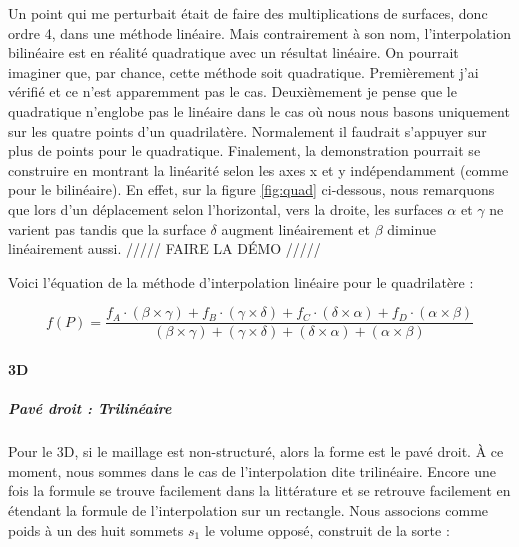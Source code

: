 Un point qui me perturbait était de faire des multiplications de surfaces, donc ordre 4, dans une méthode linéaire.
Mais contrairement à son nom, l'interpolation bilinéaire est en réalité quadratique avec un résultat linéaire.
On pourrait imaginer que, par chance, cette méthode soit quadratique.
Premièrement j'ai vérifié et ce n'est apparemment pas le cas.
Deuxièmement je pense que le quadratique n'englobe pas le linéaire dans le cas où nous nous basons uniquement sur les quatre points d'un quadrilatère.
Normalement il faudrait s'appuyer sur plus de points pour le quadratique. 
Finalement, la demonstration pourrait se construire en montrant la linéarité selon les axes x et y indépendamment (comme pour le bilinéaire). En effet, sur la figure \ref{fig:quad} ci-dessous, nous remarquons que lors d'un déplacement selon l'horizontal, vers la droite, les surfaces \(\alpha\) et \(\gamma\) ne varient pas tandis que la surface \(\delta\) augment linéairement et \(\beta\) diminue linéairement aussi.  ///// FAIRE LA DÉMO /////

Voici l'équation de la méthode d'interpolation linéaire pour le quadrilatère :

\begin{equation}
    f(P) = \frac{f_{A} \cdot (\beta \times \gamma) + f_{B} \cdot (\gamma \times \delta) + f_{C} \cdot (\delta \times \alpha) + f_{D} \cdot (\alpha \times \beta)}{(\beta \times \gamma) + (\gamma \times \delta) + (\delta \times \alpha) + (\alpha \times \beta)}
\end{equation}
    

\vspace{0.5cm}  %


\paragraph{3D}
\subparagraph{Pavé droit : Trilinéaire}

Pour le 3D, si le maillage est non-structuré, alors la forme est le pavé droit. À ce moment, nous sommes dans le cas de l'interpolation dite trilinéaire. Encore une fois la formule se trouve facilement dans la littérature et se retrouve facilement en étendant la formule de l'interpolation sur un rectangle. Nous associons comme poids à un des huit sommets \( s_1 \) le volume opposé, construit de la sorte :

